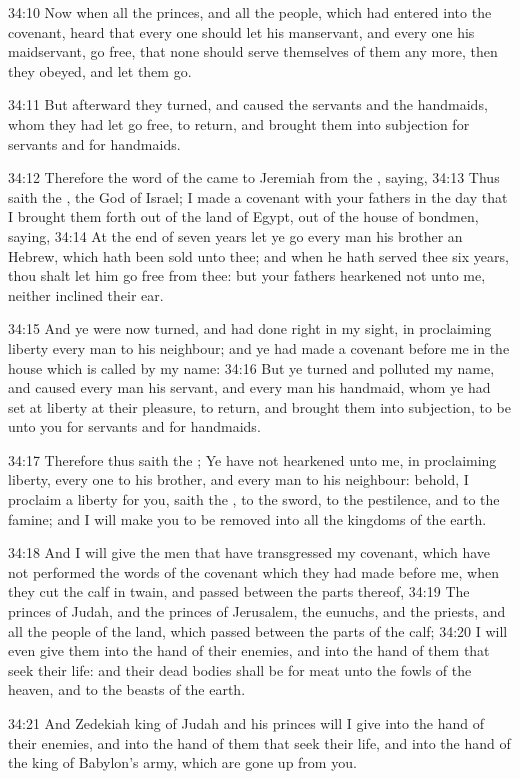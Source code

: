 34:10 Now when all the princes, and all the people, which had entered
into the covenant, heard that every one should let his manservant, and
every one his maidservant, go free, that none should serve themselves
of them any more, then they obeyed, and let them go.

34:11 But afterward they turned, and caused the servants and the
handmaids, whom they had let go free, to return, and brought them into
subjection for servants and for handmaids.

34:12 Therefore the word of the \LORD came to Jeremiah from the \LORD,
saying, 34:13 Thus saith the \LORD, the God of Israel; I made a
covenant with your fathers in the day that I brought them forth out of
the land of Egypt, out of the house of bondmen, saying, 34:14 At the
end of seven years let ye go every man his brother an Hebrew, which
hath been sold unto thee; and when he hath served thee six years, thou
shalt let him go free from thee: but your fathers hearkened not unto
me, neither inclined their ear.

34:15 And ye were now turned, and had done right in my sight, in
proclaiming liberty every man to his neighbour; and ye had made a
covenant before me in the house which is called by my name: 34:16 But
ye turned and polluted my name, and caused every man his servant, and
every man his handmaid, whom ye had set at liberty at their pleasure,
to return, and brought them into subjection, to be unto you for
servants and for handmaids.

34:17 Therefore thus saith the \LORD; Ye have not hearkened unto me, in
proclaiming liberty, every one to his brother, and every man to his
neighbour: behold, I proclaim a liberty for you, saith the \LORD, to
the sword, to the pestilence, and to the famine; and I will make you
to be removed into all the kingdoms of the earth.

34:18 And I will give the men that have transgressed my covenant,
which have not performed the words of the covenant which they had made
before me, when they cut the calf in twain, and passed between the
parts thereof, 34:19 The princes of Judah, and the princes of
Jerusalem, the eunuchs, and the priests, and all the people of the
land, which passed between the parts of the calf; 34:20 I will even
give them into the hand of their enemies, and into the hand of them
that seek their life: and their dead bodies shall be for meat unto the
fowls of the heaven, and to the beasts of the earth.

34:21 And Zedekiah king of Judah and his princes will I give into the
hand of their enemies, and into the hand of them that seek their life,
and into the hand of the king of Babylon's army, which are gone up
from you.


